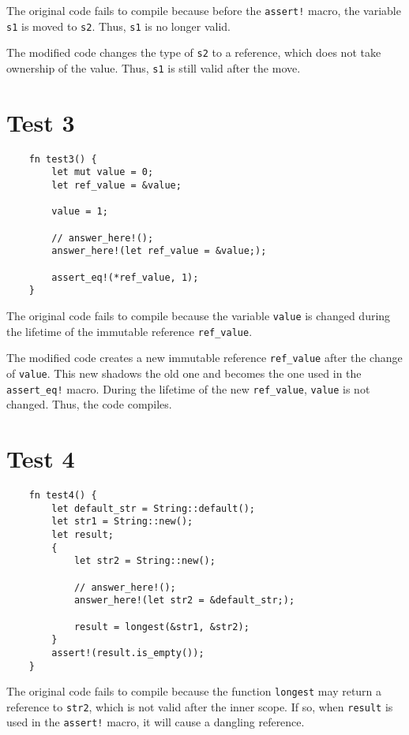 \documentclass[a4paper,12pt]{article}
\begin{document}
The original code fails to compile because before the \texttt{assert!} macro, the variable \texttt{s1} is moved to \texttt{s2}. Thus, \texttt{s1} is no longer valid.

The modified code changes the type of \texttt{s2} to a reference, which does not take ownership of the value. Thus, \texttt{s1} is still valid after the move.

\section*{Test 3}

\begin{verbatim}
    fn test3() {
        let mut value = 0;
        let ref_value = &value;

        value = 1;

        // answer_here!();
        answer_here!(let ref_value = &value;);

        assert_eq!(*ref_value, 1);
    }
\end{verbatim}

The original code fails to compile because the variable \texttt{value} is changed during the lifetime of the immutable reference \texttt{ref\_value}.

The modified code creates a new immutable reference \texttt{ref\_value} after the change of \texttt{value}. This new  shadows the old one and becomes the one used in the \texttt{assert\_eq!} macro. During the lifetime of the new \texttt{ref\_value}, \texttt{value} is not changed. Thus, the code compiles.

\section*{Test 4}

\begin{verbatim}
    fn test4() {
        let default_str = String::default();
        let str1 = String::new();
        let result;
        {
            let str2 = String::new();
    
            // answer_here!();
            answer_here!(let str2 = &default_str;);
    
            result = longest(&str1, &str2);
        }
        assert!(result.is_empty());
    }
\end{verbatim}

The original code fails to compile because the function \texttt{longest} may return a reference to \texttt{str2}, which is not valid after the inner scope. If so, when \texttt{result} is used in the \texttt{assert!} macro, it will cause a dangling reference.
\end{document}
